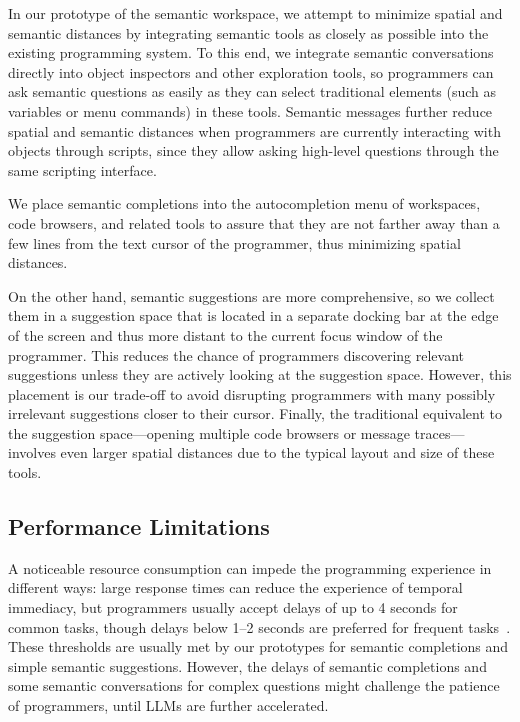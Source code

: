 In our prototype of the semantic workspace, we attempt to minimize spatial and semantic distances by integrating semantic tools as closely as possible into the existing programming system.
To this end, we integrate semantic conversations directly into object inspectors and other exploration tools, so programmers can ask semantic questions as easily as they can select traditional elements (such as variables or menu commands) in these tools.
Semantic messages further reduce spatial and semantic distances when programmers are currently interacting with objects through scripts, since they allow asking high-level questions through the same scripting interface.

We place semantic completions into the autocompletion menu of workspaces, code browsers, and related tools to assure that they are not farther away than a few lines from the text cursor of the programmer, thus minimizing spatial distances.

On the other hand, semantic suggestions are more comprehensive, so we collect them in a suggestion space that is located in a separate docking bar at the edge of the screen and thus more distant to the current focus window of the programmer.
This reduces the chance of programmers discovering relevant suggestions unless they are actively looking at the suggestion space.
However, this placement is our trade-off to avoid disrupting programmers with many possibly irrelevant suggestions closer to their cursor.
Finally, the traditional equivalent to the suggestion space---opening multiple code browsers or message traces---involves even larger spatial distances due to the typical layout and size of these tools.

\subsection*{Performance Limitations}
\label{sec:discussion/experience/performance}

A noticeable resource consumption can impede the programming experience in different ways:
large response times can reduce the experience of temporal immediacy, but programmers usually accept delays of up to 4 seconds for common tasks, though delays below 1--2 seconds are preferred for frequent tasks~\cite[p.~473]{shneiderman2005designing}.
These thresholds are usually met by our prototypes for semantic completions and simple semantic suggestions.
However, the delays of semantic completions and some semantic conversations for complex questions might challenge the patience of programmers, until LLMs are further accelerated.

